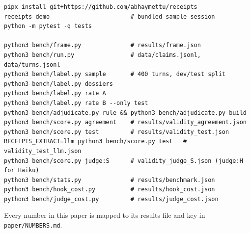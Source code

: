 \documentclass[11pt]{article}
\begin{document}
{\small
\begin{verbatim}
pipx install git+https://github.com/abhaymettu/receipts
receipts demo                       # bundled sample session
python -m pytest -q tests

python3 bench/frame.py              # results/frame.json
python3 bench/run.py                # data/claims.jsonl, data/turns.jsonl
python3 bench/label.py sample       # 400 turns, dev/test split
python3 bench/label.py dossiers
python3 bench/label.py rate A
python3 bench/label.py rate B --only test
python3 bench/adjudicate.py rule && python3 bench/adjudicate.py build
python3 bench/score.py agreement    # results/validity_agreement.json
python3 bench/score.py test         # results/validity_test.json
RECEIPTS_EXTRACT=llm python3 bench/score.py test   # validity_test_llm.json
python3 bench/score.py judge:S      # validity_judge_S.json (judge:H for Haiku)
python3 bench/stats.py              # results/benchmark.json
python3 bench/hook_cost.py          # results/hook_cost.json
python3 bench/judge_cost.py         # results/judge_cost.json
\end{verbatim}
}

Every number in this paper is mapped to its results file and key in \texttt{paper/NUMBERS.md}.



\end{document}
